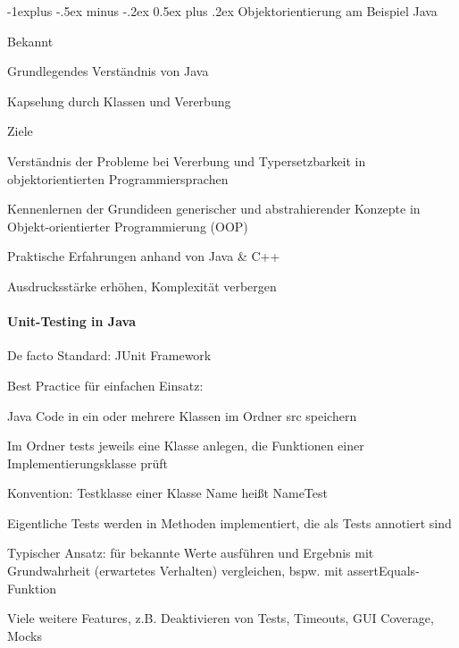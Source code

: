 \documentclass[10pt]{article}
\makeatletter
\renewcommand{\subsection}{\@startsection{subsection}{2}{0mm}%
                                {-1explus -.5ex minus -.2ex}%
                                {0.5ex plus .2ex}%
                                {\normalfont\normalsize\bfseries}}
\makeatother
\begin{document}
\subsection{Objektorientierung am Beispiel Java}
\begin{itemize*}
  \item Bekannt
  \begin{itemize*}
    \item Grundlegendes Verständnis von Java
    \item Kapselung durch Klassen und Vererbung
  \end{itemize*}
  \item Ziele
  \begin{itemize*}
    \item Verständnis der Probleme bei Vererbung und Typersetzbarkeit in objektorientierten Programmiersprachen
    \item Kennenlernen der Grundideen generischer und abstrahierender Konzepte in Objekt-orientierter Programmierung (OOP)
    \item Praktische Erfahrungen anhand von Java \& C++
  \end{itemize*}
  \item Ausdrucksstärke erhöhen, Komplexität verbergen
\end{itemize*}

\paragraph{Unit-Testing in Java}

\begin{itemize*}
  \item De facto Standard: JUnit Framework
  \item Best Practice für einfachen Einsatz:
  \begin{itemize*}
    \item Java Code in ein oder mehrere Klassen im Ordner src speichern
    \item Im Ordner tests jeweils eine Klasse anlegen, die Funktionen einer Implementierungsklasse prüft
    \item Konvention: Testklasse einer Klasse Name heißt NameTest
    \item Eigentliche Tests werden in Methoden implementiert, die als Tests annotiert sind
    \item Typischer Ansatz: für bekannte Werte ausführen und Ergebnis mit Grundwahrheit (erwartetes Verhalten) vergleichen, bspw. mit assertEquals-Funktion
  \end{itemize*}
  \item Viele weitere Features, z.B. Deaktivieren von Tests, Timeouts, GUI Coverage, Mocks
\end{itemize*}
\end{document}
